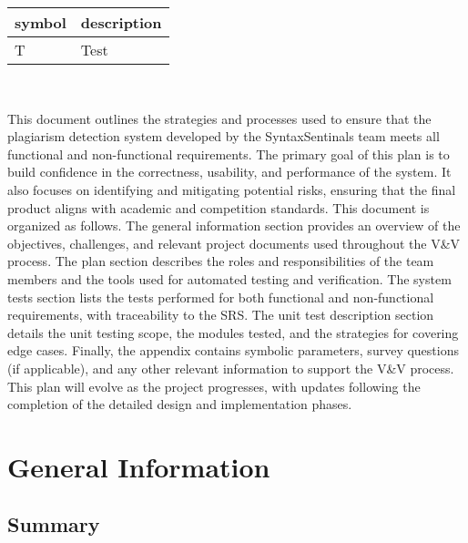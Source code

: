 \documentclass[12pt, titlepage]{article}
\begin{document}
\renewcommand{\arraystretch}{1.2}
\begin{tabular}{l l} 
  \toprule		
  \textbf{symbol} & \textbf{description}\\
  \midrule 
  T & Test\\
  \bottomrule
\end{tabular}\\



\newpage


This document outlines the strategies and processes used to ensure that the plagiarism detection system  developed by the SyntaxSentinals team meets all functional 
and non-functional requirements. The primary goal of this plan is to build confidence in the correctness, usability, and performance of the system. It also focuses 
on identifying and mitigating potential risks, ensuring that the final product aligns with academic and competition standards.
This document is organized as follows. The general information section provides an overview of the objectives, challenges, and relevant project documents 
used throughout the V\&V process. The plan section describes the roles and responsibilities of the team members and the tools used for automated testing and verification. 
The system tests section lists the tests performed for both functional and non-functional requirements, with traceability to the SRS. 
The unit test description section details the unit testing scope, the modules tested, and the strategies for covering edge cases. Finally, the appendix contains symbolic parameters, 
survey questions (if applicable), and any other relevant information to support the V\&V process. This plan will evolve as the project progresses, with updates following the completion 
of the detailed design and implementation phases.

\section{General Information}

\subsection{Summary}
\end{document}
